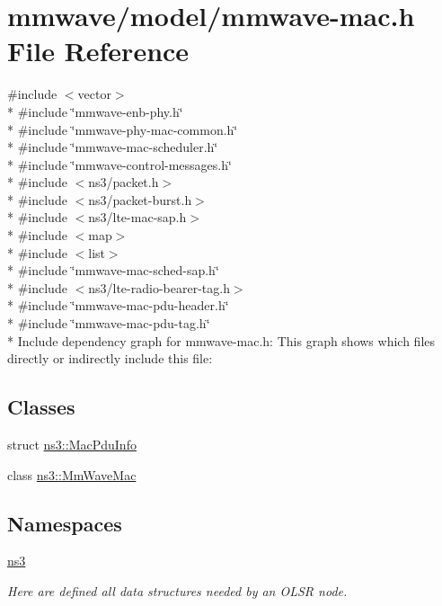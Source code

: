 \hypertarget{mmwave-mac_8h}{}\section{mmwave/model/mmwave-\/mac.h File Reference}
\label{mmwave-mac_8h}
{\ttfamily \#include $<$vector$>$}\\*
{\ttfamily \#include \char`\"{}mmwave-\/enb-\/phy.\+h\char`\"{}}\\*
{\ttfamily \#include \char`\"{}mmwave-\/phy-\/mac-\/common.\+h\char`\"{}}\\*
{\ttfamily \#include \char`\"{}mmwave-\/mac-\/scheduler.\+h\char`\"{}}\\*
{\ttfamily \#include \char`\"{}mmwave-\/control-\/messages.\+h\char`\"{}}\\*
{\ttfamily \#include $<$ns3/packet.\+h$>$}\\*
{\ttfamily \#include $<$ns3/packet-\/burst.\+h$>$}\\*
{\ttfamily \#include $<$ns3/lte-\/mac-\/sap.\+h$>$}\\*
{\ttfamily \#include $<$map$>$}\\*
{\ttfamily \#include $<$list$>$}\\*
{\ttfamily \#include \char`\"{}mmwave-\/mac-\/sched-\/sap.\+h\char`\"{}}\\*
{\ttfamily \#include $<$ns3/lte-\/radio-\/bearer-\/tag.\+h$>$}\\*
{\ttfamily \#include \char`\"{}mmwave-\/mac-\/pdu-\/header.\+h\char`\"{}}\\*
{\ttfamily \#include \char`\"{}mmwave-\/mac-\/pdu-\/tag.\+h\char`\"{}}\\*
Include dependency graph for mmwave-\/mac.h\+:
This graph shows which files directly or indirectly include this file\+:
\subsection*{Classes}
\begin{DoxyCompactItemize}
\item 
struct \hyperlink{structns3_1_1MacPduInfo}{ns3\+::\+Mac\+Pdu\+Info}
\item 
class \hyperlink{classns3_1_1MmWaveMac}{ns3\+::\+Mm\+Wave\+Mac}
\end{DoxyCompactItemize}
\subsection*{Namespaces}
\begin{DoxyCompactItemize}
\item 
 \hyperlink{namespacens3}{ns3}
\begin{DoxyCompactList}\small\item\em Here are defined all data structures needed by an O\+L\+SR node. \end{DoxyCompactList}\end{DoxyCompactItemize}
